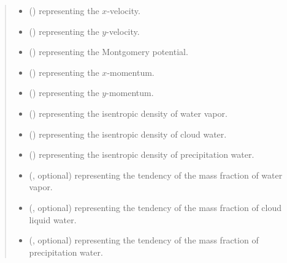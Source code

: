 \documentclass[letterpaper,10pt,english]{sphinxmanual}
\begin{document}
\begin{fulllineitems}
\begin{fulllineitems}
\begin{quote}
\begin{description}
\begin{itemize}
\item {} 
 () \textendash{}  representing the \(x\)-velocity.

\item {} 
 () \textendash{}  representing the \(y\)-velocity.

\item {} 
 () \textendash{}  representing the Montgomery potential.

\item {} 
 () \textendash{}  representing the \(x\)-momentum.

\item {} 
 () \textendash{}  representing the \(y\)-momentum.

\item {} 
 () \textendash{}  representing the isentropic density of water vapor.

\item {} 
 () \textendash{}  representing the isentropic density of cloud water.

\item {} 
 () \textendash{}  representing the isentropic density of precipitation water.

\item {} 
 (, optional) \textendash{}  representing the tendency of the mass fraction of water vapor.

\item {} 
 (, optional) \textendash{}  representing the tendency of the mass fraction of cloud liquid water.

\item {} 
 (, optional) \textendash{}  representing the tendency of the mass fraction of precipitation water.


\end{itemize}
\end{description}
\end{quote}
\end{fulllineitems}
\end{fulllineitems}
\end{document}
